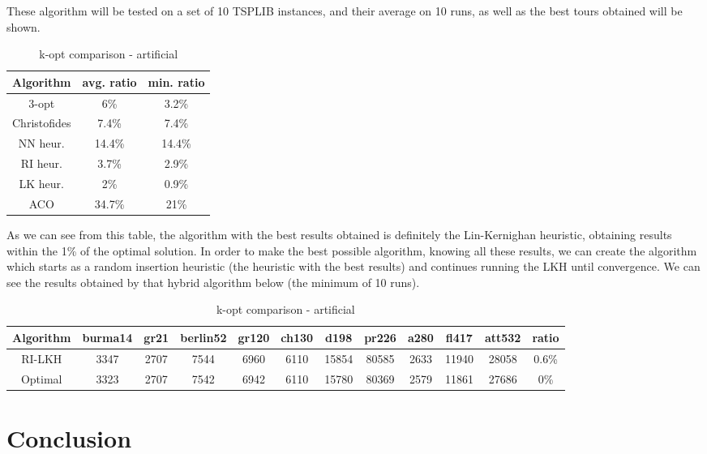 \documentclass[12pt,twoside,notitlepage]{report}
\begin{document}
These algorithm will be tested on a set of 10 TSPLIB instances, and their average on 10 runs, as well as the best tours obtained will be shown.

\begin{table}[h!]
\centering
\begin{tabular}{||c || c | c ||} 
 \hline
 Algorithm & avg. ratio & min. ratio \\[0.5ex] 
 \hline\hline
 $3$-opt & 6\% & 3.2\% \\
 Christofides & 7.4\% & 7.4\% \\  
 NN heur. & 14.4\% & 14.4\% \\
 RI heur. & 3.7\% & 2.9\% \\
 LK heur. & 2\% & 0.9\%\\
 ACO  & 34.7\% & 21\%\\
 \hline
\end{tabular}
\caption{k-opt comparison - artificial}
\label{comparison:7}
\end{table}

As we can see from this table, the algorithm with the best results obtained is definitely the Lin-Kernighan heuristic, obtaining results within the 1\% of the optimal solution. In order to make the best possible algorithm, knowing all these results, we can create the algorithm which starts as a random insertion heuristic (the heuristic with the best results) and continues running the LKH until convergence. We can see the results obtained by that hybrid algorithm below (the minimum of 10 runs).

\begin{table}[h!]
\centering
\begin{tabular}{||c || c | c | c | c | c | c | c | c | c | c | c ||} 
 \hline
 Algorithm & burma14 & gr21 & berlin52 & gr120 & ch130 & d198 & pr226 & a280 & fl417 & att532 & ratio \\[0.5ex] 
 \hline\hline
 RI-LKH & 3347 & 2707 & 7544 & 6960 & 6110 & 15854 & 80585 & 2633 & 11940 & 28058 & 0.6\% \\
 Optimal & 3323 & 2707 & 7542 & 6942 & 6110 & 15780 & 80369 & 2579 & 11861 & 27686 & 0\% \\
 \hline
\end{tabular}
\caption{k-opt comparison - artificial}
\label{comparison:7}
\end{table}

\cleardoublepage
\chapter{Conclusion}
\end{document}
